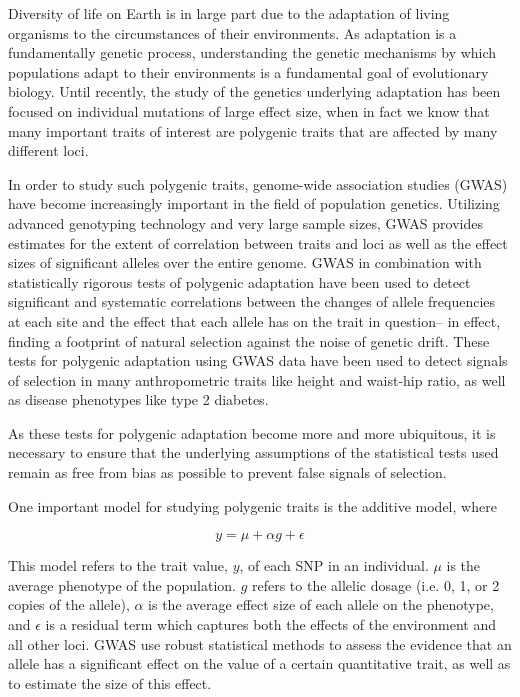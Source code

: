\documentclass[a4paper,10pt]{article}
\begin{document}
Diversity of life on Earth is in large part due to the adaptation of living
organisms to the circumstances of their environments. As adaptation is
a fundamentally genetic process, understanding the genetic mechanisms
by which populations adapt to their environments is a fundamental goal
of evolutionary biology. Until recently, the study of the genetics
underlying adaptation has been focused on individual mutations of large
effect size, when in fact we know that many important traits of interest are polygenic traits that are affected by many
different loci.

In order to study such polygenic traits, genome-wide association studies (GWAS) have become increasingly
important in the field of population genetics. Utilizing advanced
genotyping technology and very large sample sizes, GWAS provides
estimates for the extent of correlation between traits and loci as well as the
effect sizes of significant alleles over the entire genome. GWAS in combination with statistically rigorous tests of
polygenic adaptation have been used to detect significant and
systematic correlations between the changes of allele frequencies at
each site and the effect that each allele has on the trait in
question-- in effect, finding a footprint of natural selection
against the noise of genetic drift. These tests for polygenic
adaptation using GWAS data have been used to detect signals of
selection in many anthropometric traits like height
and waist-hip ratio, as well as disease phenotypes like type 2
diabetes\cite{gwasintro,gwasproblems}.

As these tests for polygenic adaptation become more and more ubiquitous, it is necessary to ensure that the underlying
assumptions of the statistical tests used remain as free from bias as
possible to prevent false signals of selection. 

One important model for studying polygenic traits is the additive model, where

\begin{equation}
  y = \mu + \alpha g + \epsilon
\end{equation}

This model refers to the trait value, $y$, of each SNP in an
individual. $\mu$ is the average phenotype of the population. $g$ refers to the
allelic dosage (i.e. 0, 1, or 2 copies of the allele), $\alpha$ is the average effect size
of each allele on the phenotype, and $ \epsilon $ is a residual term which captures both the
effects of the environment and all other loci. GWAS use robust statistical methods
to assess the evidence that an allele has a
significant effect on the value of a certain quantitative
trait, as well as to estimate the size of this effect.
\end{document}

